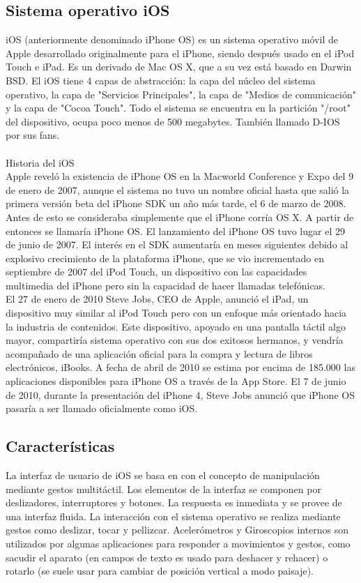 	\subsection{Sistema operativo iOS}
	iOS (anteriormente denominado iPhone OS) es un sistema operativo móvil de Apple desarrollado originalmente para el iPhone, siendo después usado en el iPod Touch e iPad. Es un derivado de Mac OS X, que a su vez está basado en Darwin BSD. El iOS tiene 4 capas de abstracción: la capa del núcleo del sistema operativo, la capa de "Servicios Principales", la capa de "Medios de comunicación" y la capa de "Cocoa Touch". Todo el sistema se encuentra en la partición "/root" del dispositivo, ocupa poco menos de 500 megabytes. También llamado D-IOS por sus fans. \cite{11}\\ \\
	Historia del iOS\\
	Apple reveló la existencia de iPhone OS en la Macworld Conference y Expo del 9 de enero de 2007, aunque el sistema no tuvo un nombre oficial hasta que salió la primera versión beta del iPhone SDK un año más tarde, el 6 de marzo de 2008. Antes de esto se consideraba simplemente que el iPhone corría OS X. A partir de entonces se llamaría iPhone OS. El lanzamiento del iPhone OS tuvo lugar el 29 de junio de 2007. El interés en el SDK aumentaría en meses siguientes debido al explosivo crecimiento de la plataforma iPhone, que se vio incrementado en septiembre de 2007 del iPod Touch, un dispositivo con las capacidades multimedia del iPhone pero sin la capacidad de hacer llamadas telefónicas. \cite{12}\\
	
	El 27 de enero de 2010 Steve Jobs, CEO de Apple, anunció el iPad, un dispositivo muy similar al iPod Touch pero con un enfoque más orientado hacia la industria de contenidos. Este dispositivo, apoyado en una pantalla táctil algo mayor, compartiría sistema operativo con sus dos exitosos hermanos, y vendría acompañado de una aplicación oficial para la compra y lectura de libros electrónicos, iBooks. A fecha de abril de 2010 se estima por encima de 185.000 las aplicaciones disponibles para iPhone OS a través de la App Store. El 7 de junio de 2010, durante la presentación del iPhone 4, Steve Jobs anunció que iPhone OS pasaría a ser llamado oficialmente como iOS. \cite{12}
	\subsection{Características}
	La interfaz de usuario de iOS se basa en con el concepto de manipulación mediante gestos multitáctil. Los elementos de la interfaz se componen por deslizadores, interruptores y botones. La respuesta es inmediata y se provee de una interfaz fluida. La interacción con el sistema operativo se realiza mediante gestos como deslizar, tocar y pellizcar. Acelerómetros y Giroscopios internos son utilizados por algunas aplicaciones para responder a movimientos y gestos, como sacudir el aparato (en campos de texto es usado para deshacer y rehacer) o rotarlo (se suele usar para cambiar de posición vertical a modo paisaje). \cite{13}\\
	
